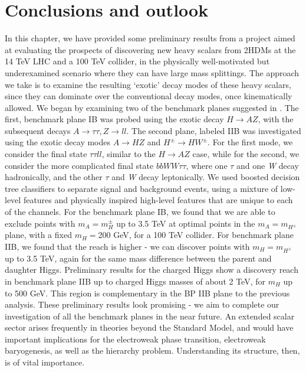 \section{Conclusions and outlook}
In this chapter, we have provided some preliminary results from a project aimed at evaluating the prospects of discovering new heavy scalars from 2HDMs at the 14 TeV LHC and a 100 TeV collider, in the physically well-motivated but underexamined scenario where they can have large mass splittings. The approach we take is to examine the resulting `exotic' decay modes of these heavy scalars, since they can dominate over the conventional decay modes, once kinematically allowed. We began by examining two of the benchmark planes suggested in \cite{Kling2016}. The first, benchmark plane IB was probed using the exotic decay $H\rightarrow AZ$, with the subsequent decays $A\rightarrow \tau\tau, Z\rightarrow ll$. The second plane, labeled IIB was investigated using the exotic decay modes $A\rightarrow HZ$ and $H^\pm \rightarrow HW^\pm$. For the first mode, we consider the final state $\tau\tau ll$, similar to the $H\rightarrow AZ$ case, while for the second, we consider the more complicated final state $bbWW\tau\tau$, where one $\tau$ and one \emph{W} decay hadronically, and the other $\tau$ and \emph{W} decay leptonically. We used boosted decision tree classifiers to separate signal and background events, using a mixture of low-level features and physically inspired high-level features that are unique to each of the channels. For the benchmark plane IB, we found that we are able to exclude points with $m_A = m_H^{\pm}$ up to 3.5 TeV at optimal points in the $m_A = m_{H^\pm}$ plane, with a fixed $m_H =$200 GeV, for a 100 TeV collider. For benchmark plane IIB, we found that the reach is higher - we can discover points with $m_H = m_{H^\pm}$ up to 3.5 TeV, again for the same mass difference between the parent and daughter Higgs. Preliminary results for the charged Higgs show a discovery reach in benchmark plane IIB up to charged Higgs masses of about 2 TeV, for $m_H$ up to 500 GeV. This region is complementary in the BP IIB plane to the previous analysis. These preliminary results look promising - we aim to complete our investigation of all the benchmark planes in the near future. An extended scalar sector arises frequently in theories beyond the Standard Model, and would have important implications for the electroweak phase transition, electroweak baryogenesis, as well as the hierarchy problem. Understanding its structure, then, is of vital importance. 
